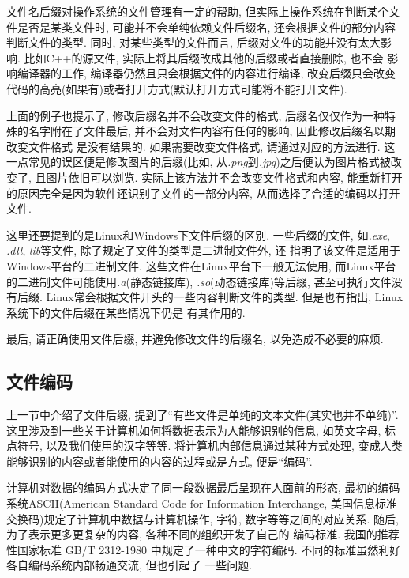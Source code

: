 文件名后缀对操作系统的文件管理有一定的帮助, 但实际上操作系统在判断某个文件是否是某类文件时, 可能并不会单纯依赖文件后缀名,
还会根据文件的部分内容判断文件的类型. 同时, 对某些类型的文件而言, 后缀对文件的功能并没有太大影响. 比如C++的源文件, 实际上将其后缀改成其他的后缀或者直接删除, 也不会
影响编译器的工作, 编译器仍然且只会根据文件的内容进行编译, 改变后缀只会改变代码的高亮(如果有)或者打开方式(默认打开方式可能将不能打开文件).

上面的例子也提示了, 修改后缀名并不会改变文件的格式, 后缀名仅仅作为一种特殊的名字附在了文件最后, 并不会对文件内容有任何的影响, 因此修改后缀名以期改变文件格式
是没有结果的. 如果需要改变文件格式, 请通过对应的方法进行. 这一点常见的误区便是修改图片的后缀(比如, 从\emph{.png}到\emph{.jpg})之后便认为图片格式被改变了, 
且图片依旧可以浏览. 实际上该方法并不会改变文件格式和内容, 能重新打开的原因完全是因为软件还识别了文件的一部分内容, 从而选择了合适的编码以打开文件.

这里还要提到的是Linux和Windows下文件后缀的区别. 一些后缀的文件, 如\emph{.exe}, \emph{.dll}, \emph{lib}等文件, 除了规定了文件的类型是二进制文件外, 还
指明了该文件是适用于Windows平台的二进制文件. 这些文件在Linux平台下一般无法使用, 而Linux平台的二进制文件可能使用\emph{.a}(静态链接库), 
\emph{.so}(动态链接库)等后缀, 甚至可执行文件没有后缀. Linux常会根据文件开头的一些内容判断文件的类型. 
但是也有指出, Linux系统下的文件后缀在某些情况下仍是
有其作用的.

最后, 请正确使用文件后缀, 并避免修改文件的后缀名, 以免造成不必要的麻烦.

\subsection{文件编码}
上一节中介绍了文件后缀, 提到了``有些文件是单纯的文本文件(其实也并不单纯)''. 这里涉及到一些关于计算机如何将数据表示为人能够识别的信息, 如英文字母, 标点符号,
以及我们使用的汉字等等. 将计算机内部信息通过某种方式处理, 变成人类能够识别的内容或者能使用的内容的过程或是方式, 便是``编码''.

计算机对数据的编码方式决定了同一段数据最后呈现在人面前的形态, 最初的编码系统ASCII(American Standard Code for Information Interchange, 
美国信息标准交换码)规定了计算机中数据与计算机操作, 字符, 数字等等之间的对应关系. 随后, 为了表示更多更复杂的内容, 各种不同的组织开发了自己的
编码标准. 我国的推荐性国家标准 GB/T 2312-1980 中规定了一种中文的字符编码. 不同的标准虽然利好各自编码系统内部畅通交流, 但也引起了
一些问题. 

